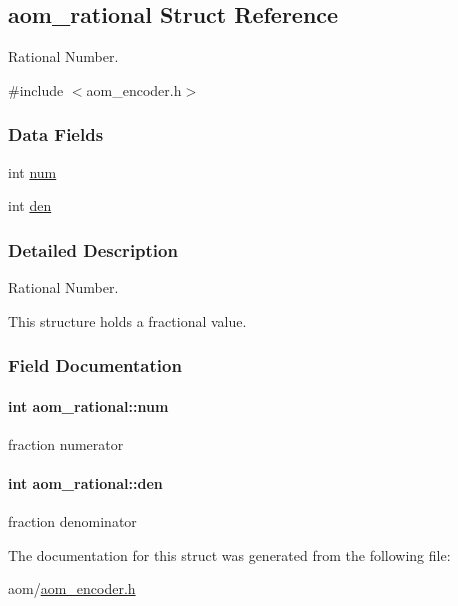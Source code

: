 \hypertarget{structaom__rational}{}\subsection{aom\+\_\+rational Struct Reference}
\label{structaom__rational}


Rational Number.  




{\ttfamily \#include $<$aom\+\_\+encoder.\+h$>$}

\subsubsection*{Data Fields}
\begin{DoxyCompactItemize}
\item 
int \hyperlink{structaom__rational_a7b48174411798c780a15f132c4650839}{num}
\item 
int \hyperlink{structaom__rational_adeddf2ea01c12b7be66536e0a0fb92c5}{den}
\end{DoxyCompactItemize}


\subsubsection{Detailed Description}
Rational Number. 

This structure holds a fractional value. 

\subsubsection{Field Documentation}
\paragraph[{\texorpdfstring{num}{num}}]{\setlength{\rightskip}{0pt plus 5cm}int aom\+\_\+rational\+::num}\hypertarget{structaom__rational_a7b48174411798c780a15f132c4650839}{}\label{structaom__rational_a7b48174411798c780a15f132c4650839}
fraction numerator 
\paragraph[{\texorpdfstring{den}{den}}]{\setlength{\rightskip}{0pt plus 5cm}int aom\+\_\+rational\+::den}\hypertarget{structaom__rational_adeddf2ea01c12b7be66536e0a0fb92c5}{}\label{structaom__rational_adeddf2ea01c12b7be66536e0a0fb92c5}
fraction denominator 

The documentation for this struct was generated from the following file\+:\begin{DoxyCompactItemize}
\item 
aom/\hyperlink{aom__encoder_8h}{aom\+\_\+encoder.\+h}\end{DoxyCompactItemize}
